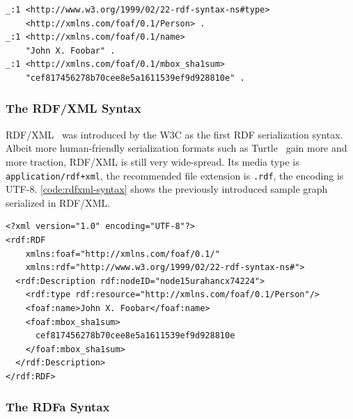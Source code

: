\begin{lstlisting}[caption={A~sample graph in N-Triples syntax.},
  label={code:ntriples-syntax}]
_:1 <http://www.w3.org/1999/02/22-rdf-syntax-ns#type>
    <http://xmlns.com/foaf/0.1/Person> .
_:1 <http://xmlns.com/foaf/0.1/name>
    "John X. Foobar" .
_:1 <http://xmlns.com/foaf/0.1/mbox_sha1sum>
    "cef817456278b70cee8e5a1611539ef9d928810e" .
\end{lstlisting}

\subsubsection{The RDF/XML Syntax}

RDF/XML~\cite{beckett2004rdfxml} was introduced by
the W3C as the first RDF serialization syntax.
Albeit more human-friendly serialization formats
such as Turtle~\cite{prudhommeaux2011turtle}
gain more and more traction,
RDF/XML is still very wide-spread.
Its media type is \texttt{application/rdf+xml},
the recommended file extension is \texttt{.rdf},
the encoding is UTF-8.
\autoref{code:rdfxml-syntax} shows the previously
introduced sample graph serialized in RDF/XML.

\begin{lstlisting}[caption={A~sample graph in RDF/XML syntax.},
  label={code:rdfxml-syntax}]
<?xml version="1.0" encoding="UTF-8"?>
<rdf:RDF
    xmlns:foaf="http://xmlns.com/foaf/0.1/"
    xmlns:rdf="http://www.w3.org/1999/02/22-rdf-syntax-ns#">
  <rdf:Description rdf:nodeID="node15urahancx74224">
    <rdf:type rdf:resource="http://xmlns.com/foaf/0.1/Person"/>
    <foaf:name>John X. Foobar</foaf:name>
    <foaf:mbox_sha1sum>
      cef817456278b70cee8e5a1611539ef9d928810e
    </foaf:mbox_sha1sum>
  </rdf:Description>
</rdf:RDF>
\end{lstlisting}

\subsubsection{The RDFa Syntax}


